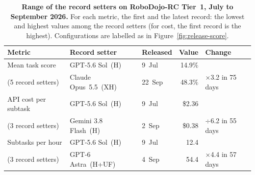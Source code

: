 \begin{table}[t]
  \centering
  \small
  \caption{\textbf{Range of the record setters on RoboDojo-RC Tier~1, July to September 2026.} For each metric, the first and the latest record: the lowest and highest values among the record setters (for cost, the first record is the highest). Configurations are labelled as in Figure~\ref{fig:release-score}.}
  \label{tab:release-records}
  \begin{tabular}{@{}lllrl@{}}
    \toprule
    Metric & Record setter & Released & Value & Change \\
    \midrule
    Mean task score & GPT-5.6 Sol~(H) & 9~Jul & 14.9\% & \\
    \quad (5 record setters) & Claude Opus~5.5~(XH) & 22~Sep & 48.3\% & $\times$3.2 in 75 days \\
    \midrule
    API cost per subtask & GPT-5.6 Sol~(H) & 9~Jul & \$2.36 & \\
    \quad (3 record setters) & Gemini 3.8 Flash~(H) & 2~Sep & \$0.38 & $\div$6.2 in 55 days \\
    \midrule
    Subtasks per hour & GPT-5.6 Sol~(H) & 9~Jul & 12.4 & \\
    \quad (3 record setters) & GPT-6 Astra~(H+UF) & 4~Sep & 54.4 & $\times$4.4 in 57 days \\
    \bottomrule
  \end{tabular}
\end{table}
